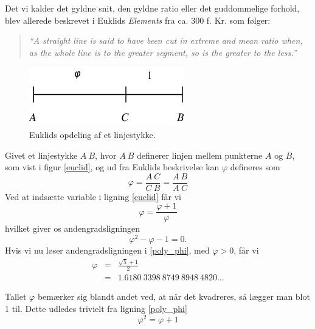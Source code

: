 {
Det vi kalder det gyldne snit, den gyldne ratio eller det guddommelige
forhold, blev allerede beskrevet i Euklids \emph{Elements} fra ca. 300
f.  Kr. som følger:
\begin{quote}
	\emph{``A straight line is said to have been cut in extreme
	and mean ratio when, as the whole line is to the greater
	segment, so is the greater to the less.''}\cite{heath1908thirteen}
\end{quote}

\begin{figure}[h!]
	\begin{center}
		\includegraphics[scale=0.49,angle=0]{afsnit/baggrund/billeder/line_segment_a_c_b}
	\end{center}
	\caption{Euklids opdeling af et linjestykke.}
	\label{line_segment}
\end{figure}

Givet et linjestykke $A\ B$, hvor $A\ B$ definerer linjen mellem
punkterne $A$ og $B$, som vist i figur \ref{euclid}, og ud fra Euklids
beskrivelse kan $\varphi$ defineres som
\begin{equation}
	\varphi	= \frac{A\ C}{C\ B} = \frac{A\ B}{A\ C}
	\label{euclid}
\end{equation}
Ved at indsætte variable i ligning \ref{euclid} får vi
\begin{equation}
	\varphi = \frac{\varphi + 1}{\varphi}
	\label{expand_euclid}
\end{equation}
hvilket giver os andengradsligningen
\begin{equation}
	\varphi^{2} - \varphi - 1 = 0.
	\label{poly_phi}
\end{equation}
Hvis vi nu løser andengradsligningen i \ref{poly_phi}, med
$\varphi > 0$, får vi
\begin{eqnarray*}
	\varphi	& =	& \frac{\sqrt{5} + 1}{2} \\
		& =	& 1.6180\ 3398\ 8749\ 8948\ 4820 \dots
\end{eqnarray*}

Tallet $\varphi$ bemærker sig blandt andet ved, at når det kvadreres, så
lægger man blot 1 til. Dette udledes trivielt fra ligning \ref{poly_phi}
\begin{equation}
	\varphi^{2} = \varphi + 1
	\label{phi_squared}
\end{equation}

}
